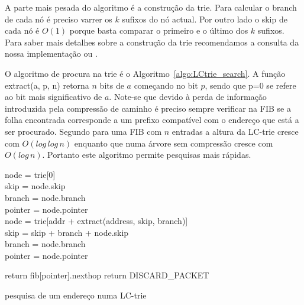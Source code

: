 \documentclass[10pt,a4paper]{article}
\begin{document}
A parte mais pesada do algoritmo é a construção da trie. Para calcular o branch de cada nó é preciso varrer os $k$ sufixos do nó actual. Por outro lado o skip de cada nó é $O(1)$ porque basta comparar o primeiro e o último dos $k$ sufixos. Para saber mais detalhes sobre a construção da trie recomendamos a consulta da nossa implementação ou \cite{SNilsson99}.

O algoritmo de procura na trie é o Algoritmo~\ref{algo:LCtrie_search}. A função extract(a, p, n) retorna $n$ bits de $a$ começando no bit $p$, sendo que p=0 se refere ao bit mais significativo de $a$. Note-se que devido à perda de informação introduzida pela compressão de caminho é preciso sempre verificar na FIB se a folha encontrada corresponde a um prefixo compatível com o endereço que está a ser procurado. Segundo \cite{SNilsson99} para uma FIB com $n$ entradas a altura da \mbox{LC-trie} cresce com $O(log \, log \, n)$ enquanto que numa árvore sem compressão cresce com $O(log \, n)$. Portanto este algoritmo permite pesquisas mais rápidas.

\begin{algorithm}
	\label{algo:LCtrie_search}

	node = trie[0] \\
	skip = node.skip \\
	branch = node.branch \\
	pointer = node.pointer \\
	{
		node = trie[addr + extract(address, skip, branch)] \\
		skip = skip + branch + node.skip \\
		branch = node.branch \\
		pointer = node.pointer \\
	}
	
	{
		return fib[pointer].nexthop
	}
	\Else
	{
		return DISCARD\_PACKET
	}
		\begin{comment}
			node = trie[0]
			skip = node.skip
			branch = node.branch
			pointer = node.pointer
			
			while( branch != 0 )
			{
				node = trie[addr + extract(address, skip, branch)]
				skip = skip + branch + node.skip
				branch = node.branch
				pointer = node.pointer
			}
			
			if( address starts with fib[pointer].prefix )
				return fib[pointer].nexthop
			else
				return DISCARD_PACKET \\
		\end{comment}
	\caption{pesquisa de um endereço numa LC-trie}
\end{algorithm}
\end{document}
